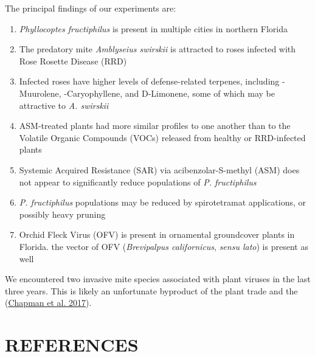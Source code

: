\documentclass{ufdissertation}[overrideChapters] %
\providecommand{\tightlist}{%
  \setlength{\itemsep}{0pt}\setlength{\parskip}{0pt}}
\begin{document}
{The principal findings of our experiments are:
\begin{enumerate}
\def\labelenumi{\arabic{enumi}.}
\tightlist
\item
  \emph{Phyllocoptes fructiphilus} is present in multiple cities in northern Florida
\item
  The predatory mite \emph{Amblyseius swirskii} is attracted to roses infected with Rose Rosette Disease (RRD)
\item
  Infected roses have higher levels of defense-related terpenes, including \textgamma-Muurolene, \textbeta-Caryophyllene, and D-Limonene, some of which may be attractive to \emph{A. swirskii}
\item
  ASM-treated plants had more similar profiles to one another than to the Volatile Organic Compounds (VOCs) released from healthy or RRD-infected plants
\item
  Systemic Acquired Resistance (SAR) via acibenzolar-S-methyl (ASM) does not appear to significantly reduce populations of \emph{P. fructiphilus}
\item
  \emph{P. fructiphilus} populations may be reduced by spirotetramat applications, or possibly heavy pruning
\item
  Orchid Fleck Virus (OFV) is present in ornamental groundcover plants in Florida. the vector of OFV (\emph{Brevipalpus californicus}, \emph{sensu lato}) is present as well
\end{enumerate}
We encountered two invasive mite species associated with plant viruses in the last three years. This is likely an unfortunate byproduct of the plant trade and the (\protect\hyperlink{ref-Chapman2017}{Chapman et al. 2017}).

\docBodyfalse
\setcounter{secnumdepth}{-1}



\setlength{\footskip}{4.2em}



\docBodyfalse
\setcounter{secnumdepth}{-1}

\realSingleSpace

\hypertarget{references}{%
\chapter*{REFERENCES}\label{references}}

}
\end{document}
